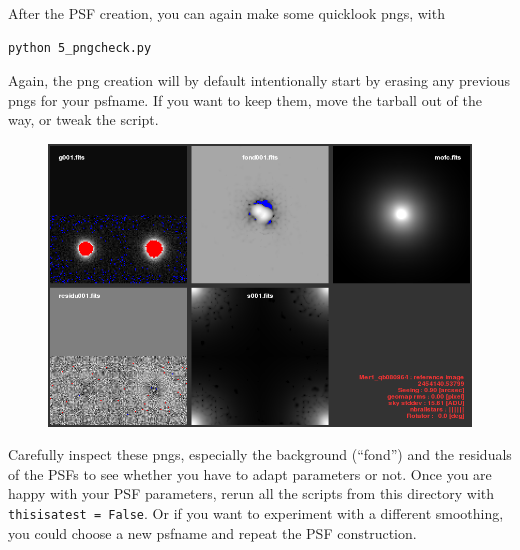 After the PSF creation, you can again make some quicklook pngs, with 

\begin{Verbatim}
python 5_pngcheck.py
\end{Verbatim}
Again, the png creation will by default intentionally start by erasing any previous pngs for your psfname. If you want to keep them, move the tarball out of the way, or tweak the script.

\begin{figure}[htbp]
\begin{minipage}[c]{0.6\textwidth}
\includegraphics[width=1.0\textwidth]{images/psfpng.png}
\end{minipage} \hfill
\begin{minipage}[c]{.36\textwidth}
\caption{ \label{psfpng}}
\end{minipage}
\end{figure}

Carefully inspect these pngs, especially the background (``fond'') and the residuals of the PSFs to see whether you have to adapt parameters or not. Once you are happy with your PSF parameters, rerun all the scripts from this directory with \verb+thisisatest = False+. Or if you want to experiment with a different smoothing, you could choose a new psfname and repeat the PSF construction.

